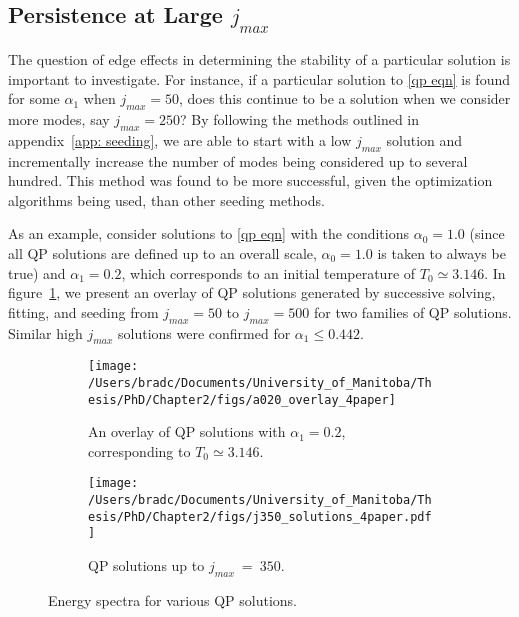 \documentclass[../PhD.tex]{subfiles}
\begin{document}

\subsection{Persistence at Large $j_{max}$}
\label{ssec: large jmax}

The question of edge effects in determining the stability of a particular solution is important to investigate. For instance, if a particular solution to \eqref{qp eqn} is found for some $\alpha_1$ when $j_{max} = 50$, does this continue to be a solution when we consider more modes, say $j_{max} = 250$? By following the methods outlined in appendix~\ref{app: seeding}, we are able to start with a low $j_{max}$ solution and incrementally increase the number of modes being considered up to several hundred. This method was found to be more successful, given the optimization algorithms being used, than other seeding methods.

As an example, consider solutions to \eqref{qp eqn} with the conditions $\alpha_0 = 1.0$ (since all QP solutions are defined up to an overall scale, $\alpha_0 = 1.0$ is taken to always be true) and $\alpha_1 = 0.2$, which corresponds to an initial temperature of $T_0 \simeq 3.146$. In figure~\ref{fig: a0.2solns}, we present an overlay of QP solutions generated by successive solving, fitting, and seeding from $j_{max} = 50$ to $j_{max}=500$ for two families of QP solutions. Similar high $j_{max}$ solutions were confirmed for $\alpha_1 \leq 0.442$.

\begin{figure}[h]
	\centering
	\begin{subfigure}[t]{0.45\textwidth}
		\texttt{[image: /Users/bradc/Documents/University\_of\_Manitoba/Thesis/PhD/Chapter2/figs/a020\_overlay\_4paper]}
		\caption{An overlay of QP solutions with $\alpha_1 = 0.2$, corresponding to $T_0 \simeq 3.146$.}
		\label{fig: a0.2solns}
	\end{subfigure}
	\:
	\begin{subfigure}[t]{0.45\textwidth}
		\texttt{[image: /Users/bradc/Documents/University\_of\_Manitoba/Thesis/PhD/Chapter2/figs/j350\_solutions\_4paper.pdf]}
		\caption{QP solutions up to $j_{max}~=~350$.}
		\label{fig: j350 solutions}
	\end{subfigure}
	\caption[Energy spectra for various QP solutions]{Energy spectra for various QP solutions.}
\end{figure}
\end{document}
